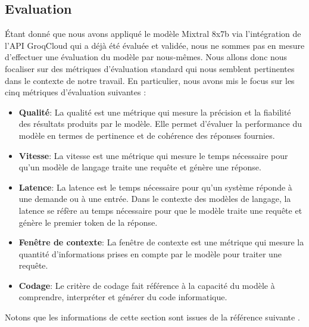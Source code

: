 \subsection{Evaluation}
Étant donné que nous avons appliqué le modèle Mixtral 8x7b via l'intégration de l'API GroqCloud qui a déjà été évaluée et validée, nous ne sommes pas en mesure d'effectuer une évaluation du modèle par nous-mêmes. Nous allons donc nous focaliser sur des métriques d'évaluation standard qui nous semblent pertinentes dans le contexte de notre travail. En particulier, nous avons mis le focus sur les cinq métriques d'évaluation suivantes :
\begin{itemize}
    \item \textbf{Qualité}: La qualité est une métrique qui mesure la précision et la fiabilité des résultats produits par le modèle. Elle permet d'évaluer la performance du modèle en termes de pertinence et de cohérence des réponses fournies.
    \item \textbf{Vitesse}: La vitesse est une métrique qui mesure le temps nécessaire pour qu'un modèle de langage traite une requête et génère une réponse.
    \item \textbf{Latence}: La latence est le temps nécessaire pour qu'un système réponde à une demande ou à une entrée. Dans le contexte des modèles de langage, la latence se réfère au temps nécessaire pour que le modèle traite une requête et génère le premier token de la réponse.
    \item \textbf{Fenêtre de contexte}: La fenêtre de contexte est une métrique qui mesure la quantité d'informations prises en compte par le modèle pour traiter une requête.
    \item \textbf{Codage}: Le critère de codage fait référence à la capacité du modèle à comprendre, interpréter et générer du code informatique.
\end{itemize}
Notons que les informations de cette section sont issues de la référence suivante \cite{mixtral8x7b}.


